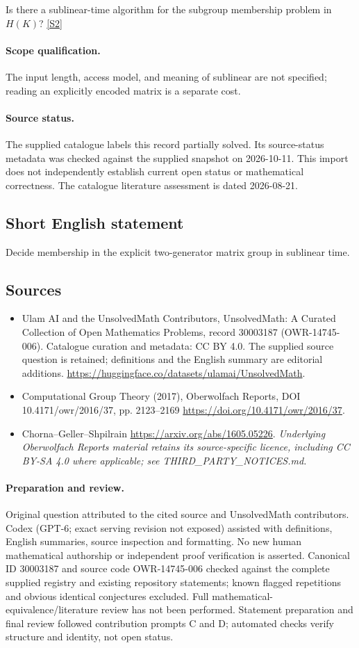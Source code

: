 \documentclass[11pt]{article}
\begin{document}
Is there a sublinear-time algorithm for the subgroup membership problem in $H(K)$? \href{https://doi.org/10.4171/owr/2016/37}{[S2]}
\paragraph{Scope qualification.}
The input length, access model, and meaning of sublinear are not specified; reading an explicitly encoded matrix is a separate cost.
\paragraph{Source status.}
The supplied catalogue labels this record partially solved. Its source-status metadata was checked against the supplied snapshot on 2026-10-11. This import does not independently establish current open status or mathematical correctness. The catalogue literature assessment is dated 2026-08-21.
\subsection{Short English statement}
Decide membership in the explicit two-generator matrix group in sublinear time.
\subsection{Sources}
\begin{itemize}
\item[S1] Ulam AI and the UnsolvedMath Contributors, UnsolvedMath: A Curated Collection of Open Mathematics Problems, record 30003187 (OWR-14745-006). Catalogue curation and metadata: CC BY 4.0. The supplied source question is retained; definitions and the English summary are editorial additions.
\url{https://huggingface.co/datasets/ulamai/UnsolvedMath}.
\item[S2] Computational Group Theory (2017), Oberwolfach Reports, DOI 10.4171/owr/2016/37, pp. 2123--2169
\url{https://doi.org/10.4171/owr/2016/37}.
\item[S3] Chorna--Geller--Shpilrain
\url{https://arxiv.org/abs/1605.05226}.
\textit{Underlying Oberwolfach Reports material retains its source-specific licence, including CC BY-SA 4.0 where applicable; see THIRD\_PARTY\_NOTICES.md.}
\end{itemize}
\paragraph{Preparation and review.}
Original question attributed to the cited source and UnsolvedMath contributors. Codex (GPT-6; exact serving revision not exposed) assisted with definitions, English summaries, source inspection and formatting. No new human mathematical authorship or independent proof verification is asserted. Canonical ID 30003187 and source code OWR-14745-006 checked against the complete supplied registry and existing repository statements; known flagged repetitions and obvious identical conjectures excluded. Full mathematical-equivalence/literature review has not been performed. Statement preparation and final review followed contribution prompts C and D; automated checks verify structure and identity, not open status.
\label{end:30003187}
\end{document}
